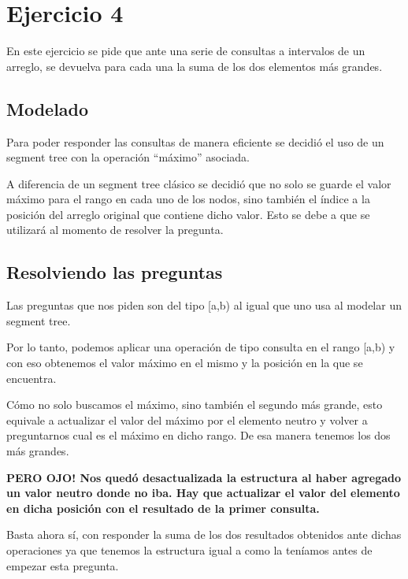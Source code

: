 \section{Ejercicio 4}

En este ejercicio se pide que ante una serie de consultas a intervalos de un arreglo, se devuelva para cada una la suma de los dos elementos más grandes.

\subsection{Modelado}

Para poder responder las consultas de manera eficiente se decidió el uso de un segment tree con la operación ``máximo'' asociada.\newline

A diferencia de un segment tree clásico se decidió que no solo se guarde el valor máximo para el rango en cada uno de los nodos, sino también el índice a la posición del arreglo original que contiene dicho valor. Esto se debe a que se utilizará al momento de resolver la pregunta.

\subsection{Resolviendo las preguntas}

Las preguntas que nos piden son del tipo [a,b) al igual que uno usa al modelar un segment tree.\newline

Por lo tanto, podemos aplicar una operación de tipo consulta en el rango [a,b) y con eso obtenemos el valor máximo en el mismo y la posición en la que se encuentra.\newline

Cómo no solo buscamos el máximo, sino también el segundo más grande, esto equivale a actualizar el valor del máximo por el elemento neutro y volver a preguntarnos cual es el máximo en dicho rango. De esa manera tenemos los dos más grandes.\newline

\textbf{PERO OJO! Nos quedó desactualizada la estructura al haber agregado un valor neutro donde no iba. Hay que actualizar el valor del elemento en dicha posición con el resultado de la primer consulta.}\newline

Basta ahora sí, con responder la suma de los dos resultados obtenidos ante dichas operaciones ya que tenemos la estructura igual a como la teníamos antes de empezar esta pregunta.

